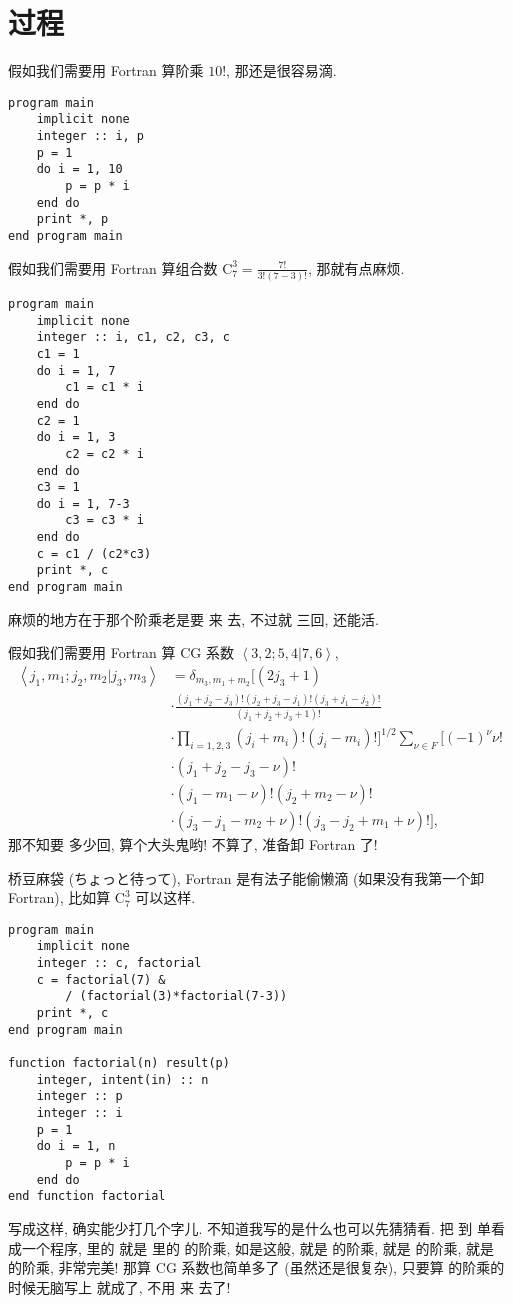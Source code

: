 \chapter{过程} \label{fortran_procedure} 

假如我们需要用 Fortran 算阶乘 $ 10! $, 那还是很容易滴. 
\begin{lstlisting} 
program main
    implicit none
    integer :: i, p
    p = 1
    do i = 1, 10
        p = p * i
    end do
    print *, p
end program main
\end{lstlisting} 

假如我们需要用 Fortran 算组合数 $ \text{C} _7^3=\frac{7!} {3!(7-3)!} $, 那就有点麻烦. 
\begin{lstlisting} 
program main
    implicit none
    integer :: i, c1, c2, c3, c
    c1 = 1
    do i = 1, 7
        c1 = c1 * i
    end do
    c2 = 1
    do i = 1, 3
        c2 = c2 * i
    end do
    c3 = 1
    do i = 1, 7-3
        c3 = c3 * i
    end do
    c = c1 / (c2*c3)
    print *, c
end program main
\end{lstlisting} 
麻烦的地方在于那个阶乘老是要  来  去, 不过就  三回, 还能活. 

假如我们需要用 Fortran 算 CG 系数 $ \left\langle 3, 2;5, 4|7, 6\right\rangle  $, 
\begin{align*} 
    \left\langle j_1, m_1;j_2, m_2|j_3, m_3\right\rangle&=\delta_{m_3, m_1+m_2} \Big[(2j_3+1)\\
    &\cdot\frac{(j_1+j_2-j_3)!(j_2+j_3-j_1)!(j_3+j_1-j_2)!} {(j_1+j_2+j_3+1)!} 
    \\
    &\cdot\prod_{i=1, 2, 3}(j_i+m_i)!(j_i-m_i)!\Big]^{1/2} \sum_{\nu\in F} [(-1)^{\nu} \nu!\\
    &\cdot(j_1+j_2-j_3-\nu)!\\
    &\cdot(j_1-m_1-\nu)!(j_2+m_2-\nu)!\\
    &\cdot(j_3-j_1-m_2+\nu)!(j_3-j_2+m_1+\nu)!], 
\end{align*} 
那不知要  多少回, 算个大头鬼哟! 不算了, 准备卸 Fortran 了!

桥豆麻袋 (ちょっと待って),  Fortran 是有法子能偷懒滴 (如果没有我第一个卸 Fortran), 比如算 $ \text{C} _7^3 $ 可以这样. 
\begin{lstlisting} 
program main
    implicit none
    integer :: c, factorial
    c = factorial(7) &
        / (factorial(3)*factorial(7-3))
    print *, c
end program main

function factorial(n) result(p)
    integer, intent(in) :: n
    integer :: p
    integer :: i 
    p = 1
    do i = 1, n
        p = p * i
    end do
end function factorial
\end{lstlisting} 
写成这样, 确实能少打几个字儿. 不知道我写的是什么也可以先猜猜看. 把  到  单看成一个程序,  里的  就是  里的  的阶乘, 如是这般,  就是  的阶乘,  就是  的阶乘,  就是  的阶乘, 非常完美! 那算 CG 系数也简单多了 (虽然还是很复杂), 只要算  的阶乘的时候无脑写上  就成了, 不用  来  去了!

